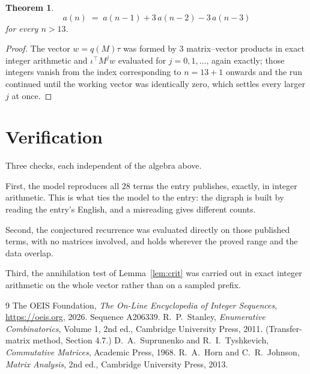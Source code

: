 \documentclass[11pt,a4paper]{article}
\theoremstyle{plain}
\newtheorem{theorem}{Theorem}
\theoremstyle{definition}
\begin{document}
\begin{theorem}
\[
a(n)\;=\;a(n-1) + 3\,a(n-2) - 3\,a(n-3)
\]
for every $n>13$.
\end{theorem}

\begin{proof}
The vector $w=q(M)\tau$ was formed by $3$ matrix--vector products in exact integer
arithmetic and $\iota^{\!\top}M^{j}w$ evaluated for $j=0,1,\dots$, again exactly; those
integers vanish from the index corresponding to $n=13+1$ onwards and the run continued
until the working vector was identically zero, which settles every larger $j$ at once.
\end{proof}

\section{Verification}

Three checks, each independent of the algebra above.

First, the model reproduces all $28$ terms the entry publishes, exactly, in integer
arithmetic. This is what ties the model to the entry: the digraph is built by reading the
entry's English, and a misreading gives different counts.

Second, the conjectured recurrence was evaluated directly on those published terms, with no
matrices involved, and holds wherever the proved range and the data overlap.

Third, the annihilation test of Lemma~\ref{lem:crit} was carried out in exact integer
arithmetic on the whole vector rather than on a sampled prefix.

\begin{thebibliography}{9}
 The OEIS Foundation, \emph{The On-Line Encyclopedia of Integer
Sequences}, \url{https://oeis.org}, 2026. Sequence A206339.
 R.~P.~Stanley, \emph{Enumerative Combinatorics}, Volume 1, 2nd ed.,
Cambridge University Press, 2011. (Transfer-matrix method, Section 4.7.)
 D.~A.~Suprunenko and R.~I.~Tyshkevich, \emph{Commutative Matrices},
Academic Press, 1968.
 R.~A.~Horn and C.~R.~Johnson, \emph{Matrix Analysis}, 2nd ed., Cambridge
University Press, 2013.
\end{thebibliography}
\end{document}
